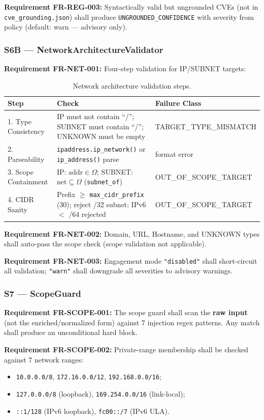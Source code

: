 \documentclass[10pt,journal,onecolumn]{IEEEtran}
\newcommand{\reqid}[1]{\textbf{#1}}
\begin{document}
\reqid{Requirement FR-REG-003:} Syntactically valid but ungrounded CVEs (not in \texttt{cve\_grounding.json}) shall produce \texttt{UNGROUNDED\_CONFIDENCE} with severity from policy (default: warn --- advisory only).

\subsubsection{S6B --- NetworkArchitectureValidator}
\reqid{Requirement FR-NET-001:} Four-step validation for IP/SUBNET targets:
\begin{table}[t]
\caption{Network architecture validation steps.}
\label{tab:net}
\begin{tabularx}{\textwidth}{l X >{\raggedright\arraybackslash}p{}}
\toprule
\textbf{Step} & \textbf{Check} & \textbf{Failure Class}\\
\midrule
1. Type Consistency & IP must not contain ``/''; SUBNET must contain ``/''; UNKNOWN must be empty & TARGET\_TYPE\_MISMATCH\\
2. Parseability & \texttt{ipaddress.ip\_network()} or \texttt{ip\_address()} parse & format error\\
3. Scope Containment & IP: $\mathrm{addr} \in \Omega$; SUBNET: $\mathrm{net} \subseteq \Omega$ (\texttt{subnet\_of}) & OUT\_OF\_SCOPE\_TARGET\\
4. CIDR Sanity & Prefix $\geq$ \texttt{max\_cidr\_prefix} (30); reject /32 subnet; IPv6 $<$ /64 rejected & OUT\_OF\_SCOPE\_TARGET\\
\bottomrule
\end{tabularx}
\end{table}

\reqid{Requirement FR-NET-002:} Domain, URL, Hostname, and UNKNOWN types shall auto-pass the scope check (scope validation not applicable).

\reqid{Requirement FR-NET-003:} Engagement mode \texttt{"disabled"} shall short-circuit all validation; \texttt{"warn"} shall downgrade all severities to advisory warnings.

\subsubsection{S7 --- ScopeGuard}
\reqid{Requirement FR-SCOPE-001:} The scope guard shall scan the \textbf{raw input} (not the enriched/normalized form) against 7 injection regex patterns. Any match shall produce an unconditional hard block.

\reqid{Requirement FR-SCOPE-002:} Private-range membership shall be checked against 7 network ranges:
\begin{itemize}
\item \texttt{10.0.0.0/8}, \texttt{172.16.0.0/12}, \texttt{192.168.0.0/16};
\item \texttt{127.0.0.0/8} (loopback), \texttt{169.254.0.0/16} (link-local);
\item \texttt{::1/128} (IPv6 loopback), \texttt{fc00::/7} (IPv6 ULA).
\end{itemize}
\end{document}
